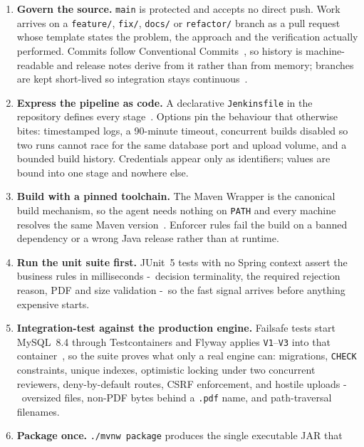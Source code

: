 \documentclass[10pt,a4paper]{article}
\begin{document}
\begin{enumerate}[leftmargin=1.9em]
  \item \textbf{Govern the source.} \texttt{main} is protected and accepts no direct push. Work
        arrives on a \texttt{feature/}, \texttt{fix/}, \texttt{docs/} or \texttt{refactor/} branch
        as a pull request whose template states the problem, the approach and the verification
        actually performed. Commits follow Conventional Commits~\cite{convcommits}, so history is
        machine-readable and release notes derive from it rather than from memory; branches are
        kept short-lived so integration stays continuous~\cite{fowlerci}.
  \item \textbf{Express the pipeline as code.} A declarative \texttt{Jenkinsfile} in the
        repository defines every stage~\cite{jenkins}. Options pin the behaviour that otherwise
        bites: timestamped logs, a 90-minute timeout, concurrent builds disabled so two runs
        cannot race for the same database port and upload volume, and a bounded build history.
        Credentials appear only as identifiers; values are bound into one stage and nowhere else.
  \item \textbf{Build with a pinned toolchain.} The Maven Wrapper is the canonical build
        mechanism, so the agent needs nothing on \texttt{PATH} and every machine resolves the same
        Maven version~\cite{maven}. Enforcer rules fail the build on a banned dependency or a
        wrong Java release rather than at runtime.
  \item \textbf{Run the unit suite first.} JUnit~5 tests with no Spring context assert the
        business rules in milliseconds -\ decision terminality, the required rejection
        reason, PDF and size validation -\ so the fast signal arrives before anything
        expensive starts.
  \item \textbf{Integration-test against the production engine.} Failsafe tests start MySQL~8.4
        through Testcontainers and Flyway applies \texttt{V1}--\texttt{V3} into that
        container~\cite{flyway}, so the suite proves what only a real engine can: migrations,
        \texttt{CHECK} constraints, unique indexes, optimistic locking under two concurrent
        reviewers, deny-by-default routes, CSRF enforcement, and hostile uploads -\
        oversized files, non-PDF bytes behind a \texttt{.pdf} name, and path-traversal filenames.
  \item \textbf{Package once.} \texttt{./mvnw package} produces the single executable JAR that

\end{enumerate}
\end{document}
